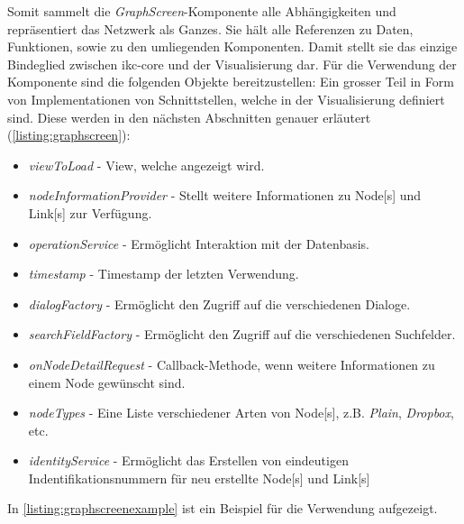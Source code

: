 Somit sammelt die \textit{GraphScreen}-Komponente alle Abhängigkeiten und repräsentiert das \gls{Netzwerk} als Ganzes. Sie hält alle Referenzen zu Daten, Funktionen, sowie zu den umliegenden Komponenten. Damit stellt sie das einzige Bindeglied zwischen \gls{ikc-core} und der Visualisierung dar. Für die Verwendung der Komponente sind die folgenden Objekte bereitzustellen: Ein grosser Teil in Form von Implementationen von Schnittstellen, welche in der Visualisierung definiert sind. Diese werden in den nächsten Abschnitten genauer erläutert (\autoref{listing:graphscreen}):

\begin{itemize}
    \item \textit{viewToLoad} - View, welche angezeigt wird.
    \item \textit{nodeInformationProvider} - Stellt weitere Informationen zu \gls{Node}[s] und \gls{Link}[s] zur Verfügung.
    \item \textit{operationService} - Ermöglicht Interaktion mit der Datenbasis.
    \item \textit{timestamp} - Timestamp der letzten Verwendung.
    \item \textit{dialogFactory} - Ermöglicht den Zugriff auf die verschiedenen Dialoge.
    \item \textit{searchFieldFactory} - Ermöglicht den Zugriff auf die verschiedenen Suchfelder.
    \item \textit{onNodeDetailRequest} - \gls{Callback}-Methode, wenn weitere Informationen zu einem \gls{Node} gewünscht sind.
    \item \textit{nodeTypes} - Eine Liste verschiedener Arten von \gls{Node}[s], z.B. \textit{Plain}, \textit{Dropbox}, etc.
    \item \textit{identityService} - Ermöglicht das Erstellen von eindeutigen Indentifikationsnummern für neu erstellte \gls{Node}[s] und \gls{Link}[s]
\end{itemize}


In \autoref{listing:graphscreenexample} ist ein Beispiel für die Verwendung aufgezeigt. 



